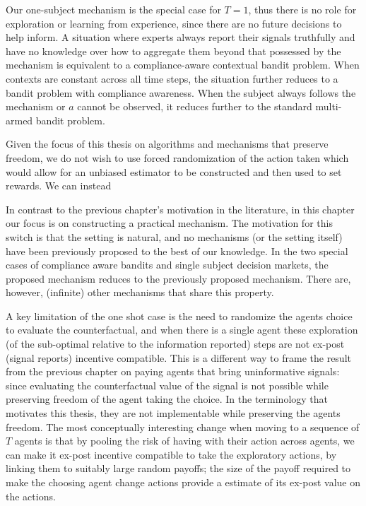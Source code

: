 Our one-subject mechanism is the special case for $T={1}$, thus there is no role for exploration or learning from experience, since there are no future decisions to help inform.
A situation where experts always report their signals truthfully and have no knowledge over how to aggregate them beyond that possessed by the mechanism is equivalent to a compliance-aware contextual bandit problem. 
When contexts are constant across all time steps, the situation further reduces to a bandit problem with compliance awareness.
When the subject always follows the mechanism or $a$ cannot be observed, it reduces further  to the standard multi-armed bandit problem. 


Given the focus of this thesis on algorithms and mechanisms that preserve freedom, we do not wish to use forced randomization of the action taken which would allow for an unbiased estimator to be constructed and then used to set rewards. 
We can instead 

 


In contrast to the previous chapter's motivation in the literature, in this chapter our focus is on constructing a practical mechanism. 
The motivation for this switch is that the setting is natural, and no mechanisms (or the setting itself) have been previously proposed to the best of our knowledge.
In the two special cases of compliance aware bandits and single subject decision markets, the proposed mechanism reduces to the previously proposed mechanism.
There are, however, (infinite) other mechanisms that share this property. 

A key limitation of the one shot case is the need to randomize the agents choice to evaluate the counterfactual, and when there is a single agent these exploration (of the sub-optimal relative to the information reported) steps are not ex-post (signal reports) incentive compatible.
This is a different way to frame the result from the previous chapter on paying agents that bring uninformative signals: since evaluating the counterfactual value of the signal is not possible while preserving freedom of the agent taking the choice. 
In the terminology that motivates this thesis, they are not implementable while preserving the agents freedom.  
The most conceptually interesting change when moving to a sequence of $T$ agents is that by pooling the risk of having with their action across agents, we can make it ex-post incentive compatible to take the exploratory actions, by linking them to suitably large random payoffs; the size of the payoff required to make the choosing agent change actions provide a estimate of its ex-post value on the actions. 




